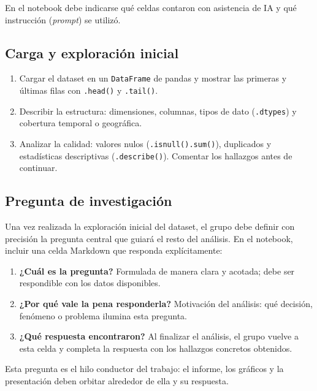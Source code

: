 \documentclass[11pt,a4paper]{article}
\begin{document}
En el notebook debe indicarse qué celdas contaron con asistencia de IA y qué instrucción (\emph{prompt})
se utilizó.

\subsection{Carga y exploración inicial}
\begin{caja}
\begin{enumerate}[label=\alph*), leftmargin=1.6em, itemsep=2pt]
  \item Cargar el dataset en un \texttt{DataFrame} de pandas y mostrar las primeras y últimas filas
        con \texttt{.head()} y \texttt{.tail()}.
  \item Describir la estructura: dimensiones, columnas, tipos de dato (\texttt{.dtypes}) y cobertura
        temporal o geográfica.
  \item Analizar la calidad: valores nulos (\texttt{.isnull().sum()}), duplicados y estadísticas descriptivas
        (\texttt{.describe()}). Comentar los hallazgos antes de continuar.
\end{enumerate}
\end{caja}

\subsection{Pregunta de investigación}
\begin{caja}
Una vez realizada la exploración inicial del dataset, el grupo debe definir con precisión la
pregunta central que guiará el resto del análisis. En el notebook, incluir una celda Markdown
que responda explícitamente:
\begin{enumerate}[label=\alph*), leftmargin=1.6em, itemsep=2pt]
  \item \textbf{¿Cuál es la pregunta?} Formulada de manera clara y acotada; debe ser respondible
        con los datos disponibles.
  \item \textbf{¿Por qué vale la pena responderla?} Motivación del análisis: qué decisión, fenómeno
        o problema ilumina esta pregunta.
  \item \textbf{¿Qué respuesta encontraron?} Al finalizar el análisis, el grupo vuelve a esta celda y
        completa la respuesta con los hallazgos concretos obtenidos.
\end{enumerate}
Esta pregunta es el hilo conductor del trabajo: el informe, los gráficos y la presentación deben
orbitar alrededor de ella y su respuesta.
\end{caja}
\end{document}
